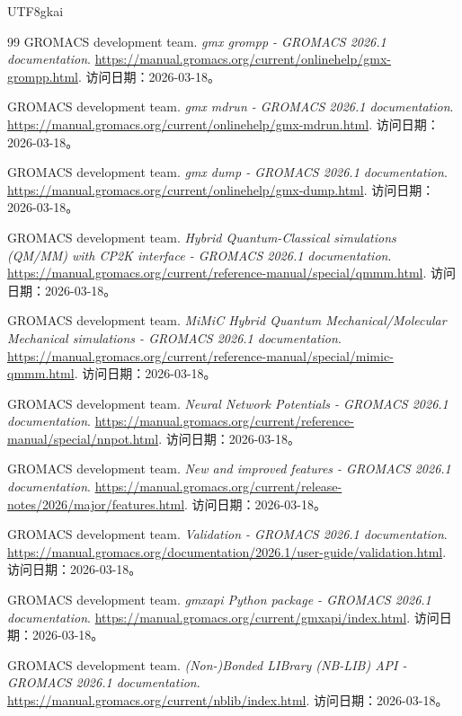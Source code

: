 \documentclass[12pt]{article}
\begin{document}
\begin{CJK*}{UTF8}{gkai}
\begin{thebibliography}{99}
GROMACS development team.
\newblock \emph{gmx grompp - GROMACS 2026.1 documentation}.
\newblock \url{https://manual.gromacs.org/current/onlinehelp/gmx-grompp.html}. 访问日期：2026-03-18。

GROMACS development team.
\newblock \emph{gmx mdrun - GROMACS 2026.1 documentation}.
\newblock \url{https://manual.gromacs.org/current/onlinehelp/gmx-mdrun.html}. 访问日期：2026-03-18。

GROMACS development team.
\newblock \emph{gmx dump - GROMACS 2026.1 documentation}.
\newblock \url{https://manual.gromacs.org/current/onlinehelp/gmx-dump.html}. 访问日期：2026-03-18。

GROMACS development team.
\newblock \emph{Hybrid Quantum-Classical simulations (QM/MM) with CP2K interface - GROMACS 2026.1 documentation}.
\newblock \url{https://manual.gromacs.org/current/reference-manual/special/qmmm.html}. 访问日期：2026-03-18。

GROMACS development team.
\newblock \emph{MiMiC Hybrid Quantum Mechanical/Molecular Mechanical simulations - GROMACS 2026.1 documentation}.
\newblock \url{https://manual.gromacs.org/current/reference-manual/special/mimic-qmmm.html}. 访问日期：2026-03-18。

GROMACS development team.
\newblock \emph{Neural Network Potentials - GROMACS 2026.1 documentation}.
\newblock \url{https://manual.gromacs.org/current/reference-manual/special/nnpot.html}. 访问日期：2026-03-18。

GROMACS development team.
\newblock \emph{New and improved features - GROMACS 2026.1 documentation}.
\newblock \url{https://manual.gromacs.org/current/release-notes/2026/major/features.html}. 访问日期：2026-03-18。

GROMACS development team.
\newblock \emph{Validation - GROMACS 2026.1 documentation}.
\newblock \url{https://manual.gromacs.org/documentation/2026.1/user-guide/validation.html}. 访问日期：2026-03-18。

GROMACS development team.
\newblock \emph{gmxapi Python package - GROMACS 2026.1 documentation}.
\newblock \url{https://manual.gromacs.org/current/gmxapi/index.html}. 访问日期：2026-03-18。

GROMACS development team.
\newblock \emph{(Non-)Bonded LIBrary (NB-LIB) API - GROMACS 2026.1 documentation}.
\newblock \url{https://manual.gromacs.org/current/nblib/index.html}. 访问日期：2026-03-18。


\end{thebibliography}
\end{CJK*}
\end{document}
